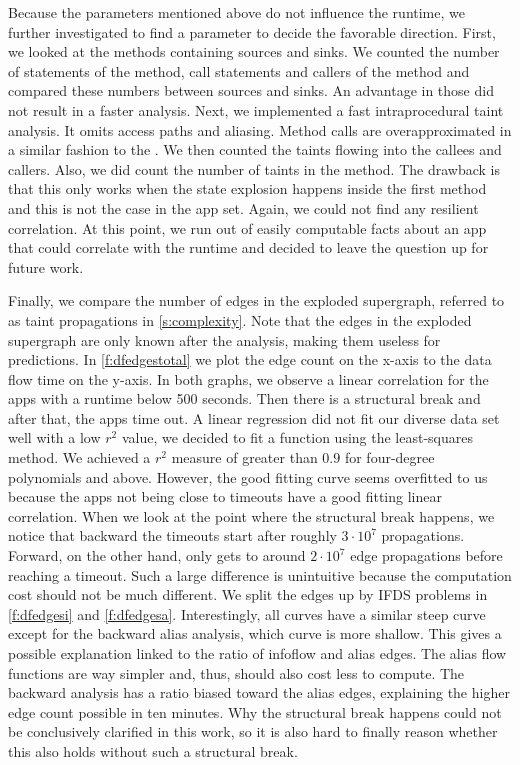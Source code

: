 \documentclass[../draft.tex]{subfiles}
\begin{document}
    Because the parameters mentioned above do not influence the runtime, we further investigated to find a parameter to decide the favorable direction.
    First, we looked at the methods containing sources and sinks.
    We counted the number of statements of the method, call statements and callers of the method and compared these numbers between sources and sinks.
    An advantage in those did not result in a faster analysis.
    Next, we implemented a fast intraprocedural taint analysis. It omits access paths and aliasing.
    Method calls are overapproximated in a similar fashion to the .
    We then counted the taints flowing into the callees and callers.
    Also, we did count the number of taints in the method.
    The drawback is that this only works when the state explosion happens inside the first method and this is not the case in the app set.
    Again, we could not find any resilient correlation.
    At this point, we run out of easily computable facts about an app that could correlate with the runtime and decided to leave the question up for future work.

    Finally, we compare the number of edges in the exploded supergraph, referred to as taint propagations in \autoref{s:complexity}.
    Note that the edges in the exploded supergraph are only known after the analysis, making them useless for predictions.
    In \autoref{f:dfedgestotal} we plot the edge count on the x-axis to the data flow time on the y-axis.
    In both graphs, we observe a linear correlation for the apps with a runtime below 500 seconds.
    Then there is a structural break and after that, the apps time out.
    A linear regression did not fit our diverse data set well with a low $r^2$ value, we decided to fit a function using the least-squares method. We achieved a $r^2$ measure of greater than $0.9$ for four-degree polynomials and above.
    However, the good fitting curve seems overfitted to us because the apps not being close to timeouts have a good fitting linear correlation.
    When we look at the point where the structural break happens, we notice that backward the timeouts start after roughly $3 \cdot 10^7$ propagations.
    Forward, on the other hand, only gets to around $2 \cdot 10^7$ edge propagations before reaching a timeout.
    Such a large difference is unintuitive because the computation cost should not be much different.
    We split the edges up by IFDS problems in \autoref{f:dfedgesi} and \autoref{f:dfedgesa}.
    Interestingly, all curves have a similar steep curve except for the backward alias analysis, which curve is more shallow.
    This gives a possible explanation linked to the ratio of infoflow and alias edges.
    The alias flow functions are way simpler and, thus, should also cost less to compute.
    The backward analysis has a ratio biased toward the alias edges, explaining the higher edge count possible in ten minutes.
    Why the structural break happens could not be conclusively clarified in this work, so it is also hard to finally reason whether this also holds without such a structural break.
\end{document}
